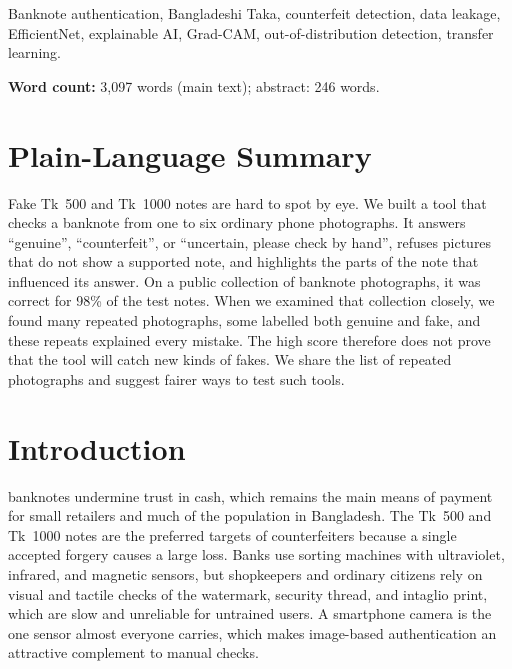 \documentclass[journal]{IEEEtran}
\begin{document}
\begin{IEEEkeywords}
Banknote authentication, Bangladeshi Taka, counterfeit detection, data leakage,
EfficientNet, explainable AI, Grad-CAM, out-of-distribution detection, transfer learning.
\end{IEEEkeywords}

\noindent\textbf{Word count:} 3{,}097 words (main text); abstract: 246 words.

\section*{Plain-Language Summary}
Fake Tk~500 and Tk~1000 notes are hard to spot by eye. We built a tool that checks a
banknote from one to six ordinary phone photographs. It answers ``genuine'',
``counterfeit'', or ``uncertain, please check by hand'', refuses pictures that do not
show a supported note, and highlights the parts of the note that influenced its answer.
On a public collection of banknote photographs, it was correct for 98\% of the test
notes. When we examined that collection closely, we found many repeated photographs,
some labelled both genuine and fake, and these repeats explained every mistake. The high
score therefore does not prove that the tool will catch new kinds of fakes. We share the
list of repeated photographs and suggest fairer ways to test such tools.

\section{Introduction}
\label{sec:intro}

 banknotes undermine trust in cash, which remains the main
means of payment for small retailers and much of the population in Bangladesh. The
Tk~500 and Tk~1000 notes are the preferred targets of counterfeiters because a single
accepted forgery causes a large loss. Banks use sorting machines with ultraviolet,
infrared, and magnetic sensors, but shopkeepers and ordinary citizens rely on visual and
tactile checks of the watermark, security thread, and intaglio print, which are slow and
unreliable for untrained users. A smartphone camera is the one sensor almost everyone
carries, which makes image-based authentication an attractive complement to manual
checks.
\end{document}
